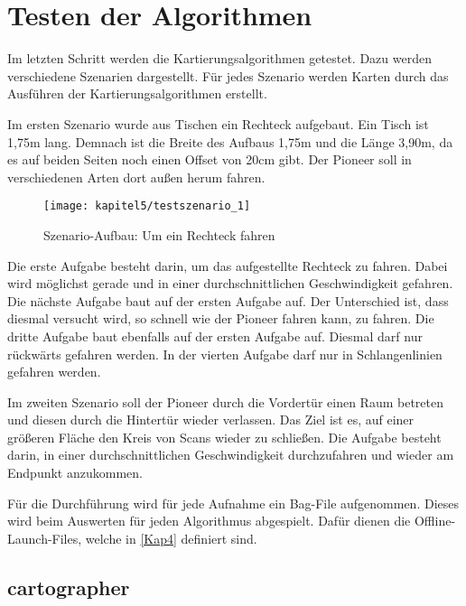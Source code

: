 \chapter{Testen der Algorithmen} \label{Kap5}

Im letzten Schritt werden die Kartierungsalgorithmen getestet. Dazu werden verschiedene Szenarien dargestellt. Für jedes Szenario werden Karten durch das Ausführen der Kartierungsalgorithmen erstellt.

Im ersten Szenario wurde aus Tischen ein Rechteck aufgebaut. Ein Tisch ist 1,75m lang. Demnach ist die Breite des Aufbaus 1,75m und die Länge 3,90m, da es auf beiden Seiten noch einen Offset von 20cm gibt. Der Pioneer soll in verschiedenen Arten dort außen herum fahren.

\begin{figure}[t]
  \centering
  \texttt{[image: kapitel5/testszenario\_1]}
  \caption{Szenario-Aufbau: Um ein Rechteck fahren}
  \label{Kap5:Szenario1}
\end{figure}

Die erste Aufgabe besteht darin, um das aufgestellte Rechteck zu fahren. Dabei wird möglichst gerade und in einer durchschnittlichen Geschwindigkeit gefahren. Die nächste Aufgabe baut auf der ersten Aufgabe auf. Der Unterschied ist, dass diesmal versucht wird, so schnell wie der Pioneer fahren kann, zu fahren. Die dritte Aufgabe baut ebenfalls auf der ersten Aufgabe auf. Diesmal darf nur rückwärts gefahren werden. In der vierten Aufgabe darf nur in Schlangenlinien gefahren werden.

Im zweiten Szenario soll der Pioneer durch die Vordertür einen Raum betreten und diesen durch die Hintertür wieder verlassen. Das Ziel ist es, auf einer größeren Fläche den Kreis von Scans wieder zu schließen. Die Aufgabe besteht darin, in einer durchschnittlichen Geschwindigkeit durchzufahren und wieder am Endpunkt anzukommen.

Für die Durchführung wird für jede Aufnahme ein Bag-File aufgenommen. Dieses wird beim Auswerten für jeden Algorithmus abgespielt. Dafür dienen die Offline-Launch-Files, welche in \autoref{Kap4} definiert sind.

\section{cartographer}

